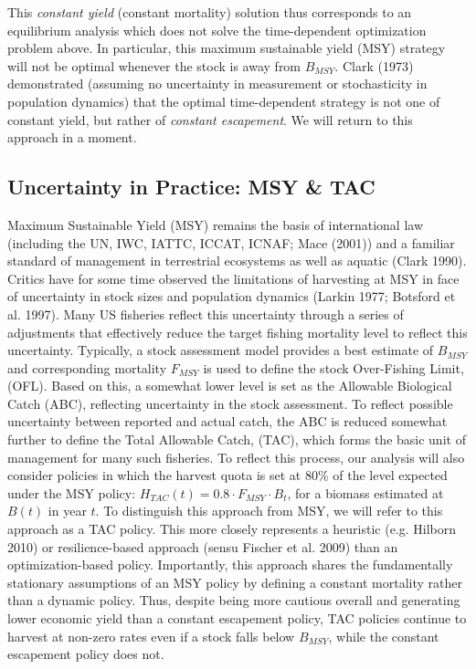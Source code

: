 \documentclass[3p]{elsarticle} %
\begin{document}
This \emph{constant yield} (constant mortality) solution thus
corresponds to an equilibrium analysis which does not solve the
time-dependent optimization problem above. In particular, this maximum
sustainable yield (MSY) strategy will not be optimal whenever the stock
is away from \(B_{MSY}\). Clark (1973) demonstrated (assuming no
uncertainty in measurement or stochasticity in population dynamics) that
the optimal time-dependent strategy is not one of constant yield, but
rather of \emph{constant escapement}. We will return to this approach in
a moment.

\hypertarget{uncertainty-in-practice-msy-tac}{%
\subsection{Uncertainty in Practice: MSY \&
TAC}\label{uncertainty-in-practice-msy-tac}}

Maximum Sustainable Yield (MSY) remains the basis of international law
(including the UN, IWC, IATTC, ICCAT, ICNAF; Mace (2001)) and a familiar
standard of management in terrestrial ecosystems as well as aquatic
(Clark 1990). Critics have for some time observed the limitations of
harvesting at MSY in face of uncertainty in stock sizes and population
dynamics (Larkin 1977; Botsford et al. 1997). Many US fisheries reflect
this uncertainty through a series of adjustments that effectively reduce
the target fishing mortality level to reflect this uncertainty.
Typically, a stock assessment model provides a best estimate of
\(B_{MSY}\) and corresponding mortality \(F_{MSY}\) is used to define
the stock Over-Fishing Limit, (OFL). Based on this, a somewhat lower
level is set as the Allowable Biological Catch (ABC), reflecting
uncertainty in the stock assessment. To reflect possible uncertainty
between reported and actual catch, the ABC is reduced somewhat further
to define the Total Allowable Catch, (TAC), which forms the basic unit
of management for many such fisheries. To reflect this process, our
analysis will also consider policies in which the harvest quota is set
at 80\% of the level expected under the MSY policy:
\(H_{TAC}(t) = 0.8 \cdot F_{MSY} \cdot B_t\), for a biomass estimated at
\(B(t)\) in year \(t\). To distinguish this approach from MSY, we will
refer to this approach as a TAC policy. This more closely represents a
heuristic (e.g. Hilborn 2010) or resilience-based approach (sensu
Fischer et al. 2009) than an optimization-based policy. Importantly,
this approach shares the fundamentally stationary assumptions of an MSY
policy by defining a constant mortality rather than a dynamic policy.
Thus, despite being more cautious overall and generating lower economic
yield than a constant escapement policy, TAC policies continue to
harvest at non-zero rates even if a stock falls below \(B_{MSY}\), while
the constant escapement policy does not.
\end{document}

